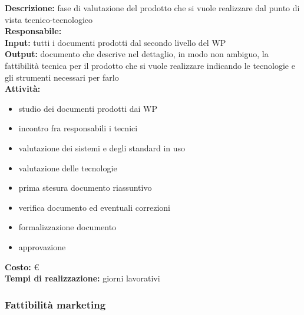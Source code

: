 \textbf{Descrizione:} fase di valutazione del prodotto che si vuole realizzare dal punto di vista tecnico-tecnologico \\
\linebreak
\textbf{Responsabile:} \\
\textbf{Input:} tutti i documenti prodotti dal secondo livello del WP\\
\linebreak
\textbf{Output:} documento che descrive nel dettaglio, in modo non ambiguo, la fattibilità tecnica per il prodotto che si vuole realizzare indicando le tecnologie e gli strumenti necessari per farlo\\
\linebreak
\textbf{Attività:}
\begin{itemize}
\item studio dei documenti prodotti dai WP
\item incontro fra responsabili i tecnici
\item valutazione dei sistemi e degli standard in uso
\item valutazione delle tecnologie
\item prima stesura documento riassuntivo
\item verifica documento ed eventuali correzioni
\item formalizzazione documento
\item approvazione
\end{itemize}
\textbf{Costo:} \euro \\
\textbf{Tempi di realizzazione:}  giorni lavorativi


\subsubsection{Fattibilità marketing}

